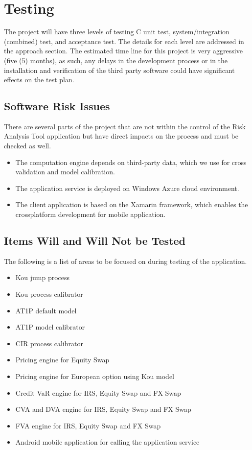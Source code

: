 \section{Testing}\label{sec:testing}

The project will have three levels of testing C unit test, system/integration (combined) test, and acceptance test. The details for each level are addressed in the approach section.
The estimated time line for this project is very aggressive (five (5) months), as such, any delays in the development process or in the installation and verification of the third party software could have significant effects on the test plan. 

\subsection{Software Risk Issues}

There are several parts of the project that are not within the control of the Risk Analysis
Tool application but have direct impacts on the process and must be checked as
well.
\begin{itemize}
  \item The computation engine depends on third-party data, which we use for cross validation
and model calibration.
  \item The application service is deployed on Windows Azure cloud environment.
  \item The client application is based on the Xamarin framework, which enables the crossplatform
development for mobile application.
\end{itemize}

\subsection{Items Will and Will Not be Tested}

The following is a list of areas to be focused on during testing of the application.
\begin{itemize}
  \item Kou jump process
  \item Kou process calibrator
  \item AT1P default model
  \item AT1P model calibrator
  \item CIR process calibrator
  \item Pricing engine for Equity Swap
  \item Pricing engine for European option using Kou model
  \item Credit VaR engine for IRS, Equity Swap and FX Swap
  \item CVA and DVA engine for IRS, Equity Swap and FX Swap
  \item FVA engine for IRS, Equity Swap and FX Swap
  \item Android mobile application for calling the application service
\end{itemize}

